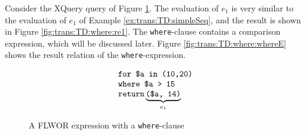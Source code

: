 \begin{myExample}
Consider the XQuery query of Figure \ref{fig:trans:TD:whereQuery}. The evaluation of $e_{1}$ is very similar to
the evaluation of $e_{1}$ of Example \ref{ex:trans:TD:simpleSeq}, and the
result is shown in Figure \ref{fig:trans:TD:where:re1}. The \texttt{where}-clause contains a comparison
expression, which will be discussed later. Figure \ref{fig:trans:TD:where:whereE} shows the result relation of the
\texttt{where}-expression.

\begin{figure}[h]
\centering
\begin{equation*}
\begin{array}{l}
\mbox{\texttt{for \$a in (10,20)}} \\
\mbox{\texttt{where \$a > 15}} \\
\mbox{\texttt{return}} \underbrace{\mbox{\texttt{(\$a, 14)}}}_{e_{1}}
\end{array}
\end{equation*}
\caption{A FLWOR expression with a \texttt{where}-clause \label{fig:trans:TD:whereQuery}}
\end{figure}

\begin{figure}[h]
\centering
{}
\qquad
{}
\qquad
{}


\end{figure}
\end{myExample}
